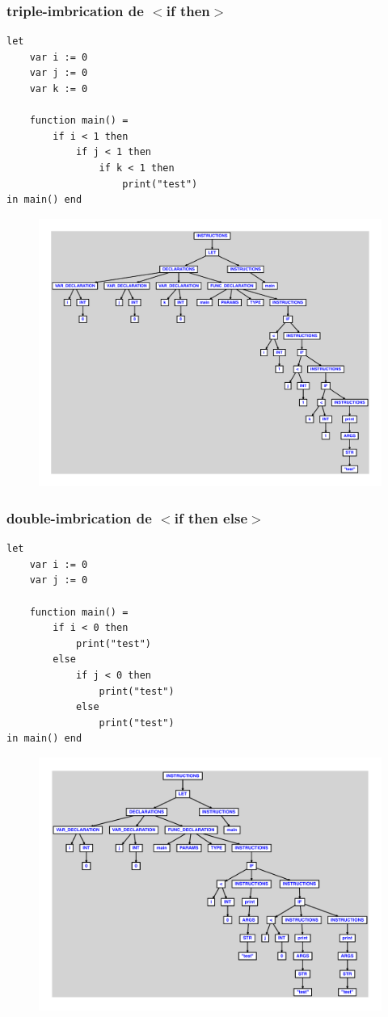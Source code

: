 \documentclass{article}
\begin{document}
\subsubsection{triple-imbrication de $ < $if then$ > $}
\begin{lstlisting}
let
	var i := 0
	var j := 0
	var k := 0

	function main() =
		if i < 1 then
			if j < 1 then
				if k < 1 then
					print("test")
in main() end
\end{lstlisting}
\newpage
\begin{figure}[H]
\centering
\includegraphics[max width=\textwidth]{ast/ast_264.pdf}
\end{figure}
\newpage
\subsubsection{double-imbrication de $ < $if then else$ > $}
\begin{lstlisting}
let
	var i := 0
	var j := 0

	function main() =
		if i < 0 then
			print("test")
		else
			if j < 0 then
				print("test")
			else
				print("test")
in main() end
\end{lstlisting}
\newpage
\begin{figure}[H]
\centering
\includegraphics[max width=\textwidth]{ast/ast_265.pdf}
\end{figure}
\newpage
\end{document}
